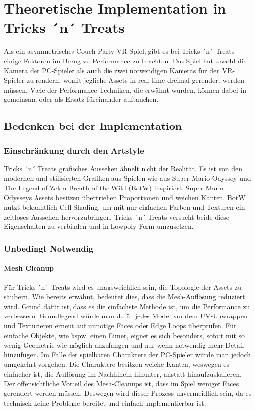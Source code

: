 \chapter{Theoretische Implementation in Tricks ´n´ Treats}

Als ein asymmetrisches Couch-Party VR Spiel, gibt es bei Tricks ´n´ Treats einige Faktoren im Bezug zu Performance zu beachten. Das Spiel hat sowohl die Kamera der PC-Spieler als auch die zwei notwendigen Kameras für den VR-Spieler zu rendern, womit jegliche Assets in real-time dreimal gerendert werden müssen. Viele der Performance-Techniken, die erwähnt wurden, können dabei in gemeinsam oder als Ersatz füreinander auftauchen.

\section{Bedenken bei der Implementation}

\subsection{Einschränkung durch den Artstyle}

Tricks ´n´ Treats grafisches Aussehen ähnelt nicht der Realität. Es ist von den modernen und stilisierten Grafiken aus Spielen wie aus Super Mario Odyssey und The Legend of Zelda Breath of the Wild (BotW) inspiriert. Super Mario Odysseys Assets besitzen übertrieben Proportionen und weichen Kanten. BotW nutzt bekanntlich Cell-Shading, um mit nur einfachen Farben und Texturen ein zeitloses Aussehen hervorzubringen. Tricks ´n´ Treats versucht beide diese Eigenschaften zu verbinden und in Lowpoly-Form umzusetzen.

\subsection{Unbedingt Notwendig}

\subsubsection{Mesh Cleanup}

Für Tricks ´n´ Treats wird es unausweichlich sein, die Topologie der Assets zu säubern. Wie bereits erwähnt, bedeutet dies, dass die Mesh-Auflösung reduziert wird. Grund dafür ist, dass es die einfachste Methode ist, um die Performance zu verbessern. Grundlegend würde man dafür jedes Model vor dem UV-Unwrappen und Texturieren erneut auf unnötige Faces oder Edge Loops überprüfen.
Für einfache Objekte, wie bspw. einen Eimer, eignet es sich besonders, sofort mit so wenig Geometrie wie möglich anzufangen und nur wenn notwendig mehr Detail hinzufügen. Im Falle der spielbaren Charaktere der PC-Spieler würde man jedoch umgekehrt vorgehen. Die Charaktere besitzen weiche Kanten, weswegen es einfacher ist, die Auflösung im Nachhinein hinunter, anstatt hinaufzuskalieren.
Der offensichtliche Vorteil des Mesh-Cleanups ist, dass im Spiel weniger Faces gerendert werden müssen. Deswegen wird dieser Prozess unvermeidlich sein, da es technisch keine Probleme bereitet und einfach implementierbar ist.

